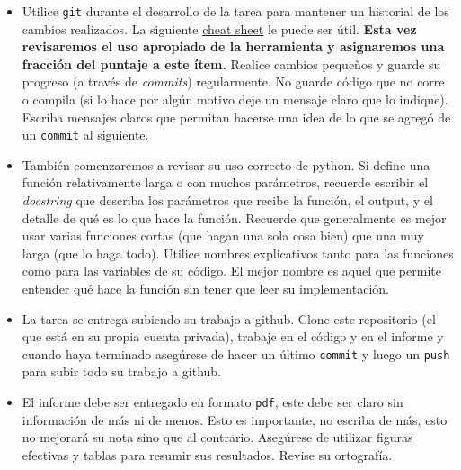 \documentclass[letter, 11pt]{article}
\begin{document}
\pagebreak
{}
\begin{itemize}

  \item Utilice \texttt{git} durante el desarrollo de la tarea para mantener un
    historial de los cambios realizados. La siguiente
    \href{https://education.github.com/git-cheat-sheet-education.pdf}{cheat
      sheet} le puede ser útil. {\bf Esta vez revisaremos el uso apropiado de
    la herramienta y asignaremos una fracción del puntaje a este ítem.} Realice
    cambios pequeños y guarde su progreso (a través de \emph{commits})
    regularmente. No guarde código que no corre o compila (si lo hace por algún
    motivo deje un mensaje claro que lo indique). Escriba mensajes claros que
    permitan hacerse una idea de lo que se agregó de un \texttt{commit} al
    siguiente.

  \item También comenzaremos a revisar su uso correcto de python. Si define una
    función relativamente larga o con muchos parámetros, recuerde escribir el
    \emph{docstring} que describa los parámetros que recibe la función, el
    output, y el detalle de qué es lo que hace la función. Recuerde que
    generalmente es mejor usar varias funciones cortas (que hagan una sola cosa
    bien) que una muy larga (que lo haga todo).  Utilice nombres explicativos
    tanto para las funciones como para las variables de su código. El mejor
    nombre es aquel que permite entender qué hace la función sin tener que leer
    su implementación.

  \item La tarea se entrega subiendo su trabajo a github. Clone este
    repositorio (el que está en su propia cuenta privada), trabaje en el código
    y en el informe y cuando haya terminado asegúrese de hacer un último
    \texttt{commit} y luego un \texttt{push} para subir todo su trabajo a
    github.

  \item El informe debe ser entregado en formato \texttt{pdf}, este debe ser
    claro sin información de más ni de menos. Esto es importante, no escriba de
    más, esto no mejorará su nota sino que al contrario. Asegúrese de utilizar
    figuras efectivas y tablas para resumir sus resultados. Revise su
    ortografía.

\end{itemize}
\end{document}
